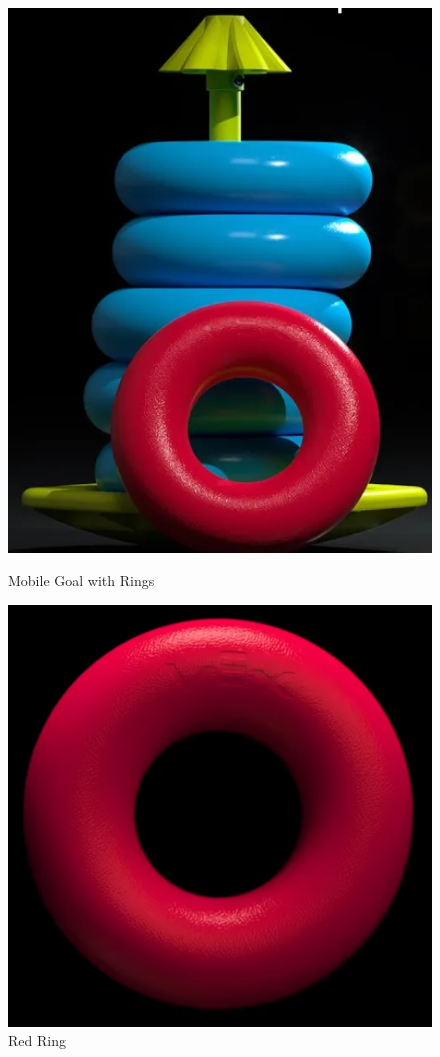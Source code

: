 {\begin{figure}[hbt!]
\begin{minipage}{.5\textwidth}
        \includegraphics[width=.8\linewidth]{images/Stake.png}
        \caption{Mobile Goal with Rings}
        \label{fig:stake}
    \end{minipage}
    \begin{minipage}{.5\textwidth}
        \centering
        \includegraphics[width=.8\linewidth]{images/Red Ring.jpeg}
        \caption{Red Ring}
        \label{fig:red-ring}
    \end{minipage}
\end{figure}
}
